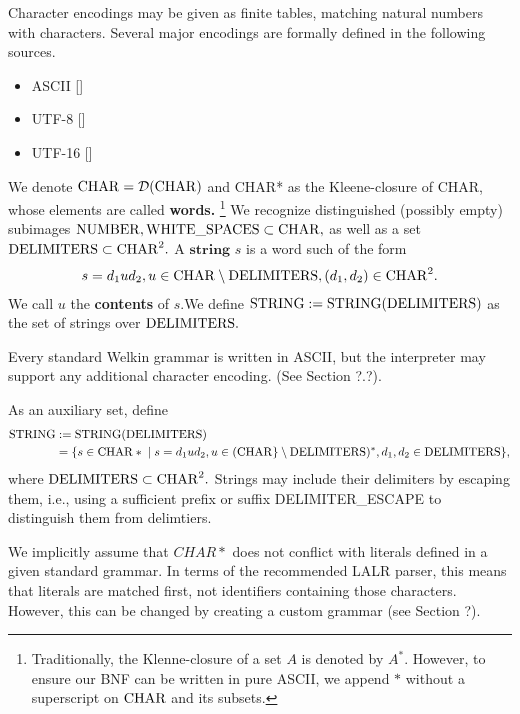 Character encodings may be given as finite tables, matching natural numbers with characters. Several major encodings are formally defined in the following sources.
\begin{itemize}
	\item ASCII []
	\item UTF-8 []
	\item UTF-16 []
\end{itemize}

We denote $\mathrm{CHAR} = \mathcal{D}(\mathrm{CHAR})$ and CHAR* as the
Kleene-closure of CHAR, whose elements are called \textbf{words.}
\footnote{Traditionally, the Klenne-closure of a set $A$ is denoted by $A^{*}.$ However, to ensure our BNF
can be written in pure ASCII, we append $*$ without a superscript on $\mathrm{CHAR}$ and its subsets.}
We recognize distinguished (possibly empty) subimages $\mathrm{NUMBER}, \mathrm{WHITE\_SPACES} \subset \mathrm{CHAR},$ as well as a set $\mathrm{DELIMITERS} \subset \mathrm{CHAR}^{2}.$ A $\textbf{string}$ $s$ is a word such of the form
\begin{align*}
s = d_{1}ud_{2}, u \in \mathrm{CHAR} \setminus \mathrm{DELIMITERS}, (d_{1}, d_{2}) \in \mathrm{CHAR}^{2}.
\end{align*}
We call $u$ the \textbf{contents} of $s. $We define $\mathrm{STRING} := \mathrm{STRING}(\mathrm{DELIMITERS})$ as the set of strings over $\mathrm{DELIMITERS}.$

Every standard Welkin grammar is written in ASCII, but the interpreter may support any additional character encoding. (See Section ?.?).

As an auxiliary set, define
\begin{align*}
	\mathrm{STRING} &:= \mathrm{STRING}(\mathrm{DELIMITERS}) \\ &= \{s \in \mathrm{CHAR}* \;|\; s = d_{1} u d_{2}, u \in (\mathrm{CHAR}\} \setminus \mathrm{DELIMITERS})^{*}, d_{1}, d_{2} \in \mathrm{DELIMITERS}\},\end{align*}
where $\mathrm{DELIMITERS} \subset \mathrm{CHAR}^{2}.$
Strings may include their delimiters by escaping them, i.e., using a sufficient prefix or suffix DELIMITER\_ESCAPE to distinguish them from delimtiers.

We implicitly assume that $CHAR*$ does not conflict with literals defined in a given standard grammar. In terms of the recommended LALR parser, this means that literals are matched first, not identifiers containing those characters. However, this can be changed by creating a custom grammar (see Section ?).


